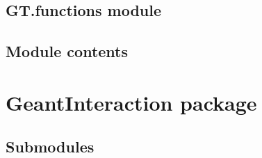 \documentclass[letterpaper,10pt,english]{sphinxmanual}
\begin{document}
\subsection{GT.functions module}
\label{\detokenize{GT:module-GT.functions}}\label{\detokenize{GT:gt-functions-module}}

\begin{fulllineitems}
\label{\detokenize{GT:GT.functions.GetLastPoints}}
\pysigstartsignatures
{}
\pysigstopsignatures
\end{fulllineitems}


\begin{fulllineitems}
\label{\detokenize{GT:GT.functions.PlotTracks}}
\pysigstartsignatures
{}
\pysigstopsignatures
\end{fulllineitems}



\subsection{Module contents}
\label{\detokenize{GT:module-GT}}\label{\detokenize{GT:module-contents}}
\sphinxstepscope


\section{GeantInteraction package}
\label{\detokenize{GeantInteraction:geantinteraction-package}}\label{\detokenize{GeantInteraction::doc}}

\subsection{Submodules}
\label{\detokenize{GeantInteraction:submodules}}
\end{document}
